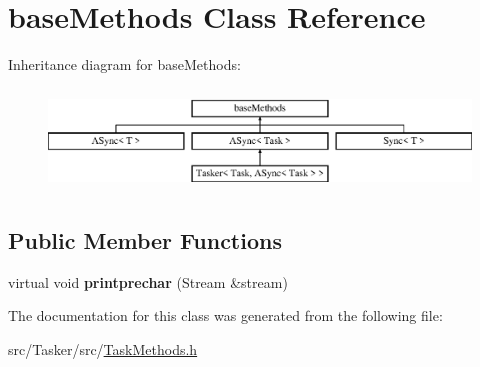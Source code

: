 \hypertarget{classbase_methods}{}\section{base\+Methods Class Reference}
\label{classbase_methods}
Inheritance diagram for base\+Methods\+:\begin{figure}[H]
\begin{center}
\leavevmode
\includegraphics[height=2.731707cm]{classbase_methods}
\end{center}
\end{figure}
\subsection*{Public Member Functions}
\begin{DoxyCompactItemize}
\item 
\mbox{\label{classbase_methods_a734354bd066339c46165903791f01e11}} 
virtual void {\bfseries printprechar} (Stream \&stream)
\end{DoxyCompactItemize}


The documentation for this class was generated from the following file\+:\begin{DoxyCompactItemize}
\item 
src/\+Tasker/src/\hyperlink{_task_methods_8h}{Task\+Methods.\+h}\end{DoxyCompactItemize}
